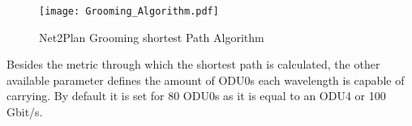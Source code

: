 \documentclass[12pt, a4paper]{article}
\begin{document}
	\vspace{0.5cm}
	\begin{figure}[h!]
		\centering
		\texttt{[image: Grooming\_Algorithm.pdf]}
		\caption{Net2Plan Grooming shortest Path Algorithm}
		\label{Grooming_Algorithm}
	\end{figure}	
	
	Besides the metric through which the shortest path is calculated, the other available parameter defines the amount of ODU0s each wavelength is capable of carrying. By default it is set for 80 ODU0s as it is equal to an ODU4 or 100 Gbit/s.\\

	
		
	
	
\end{document}
